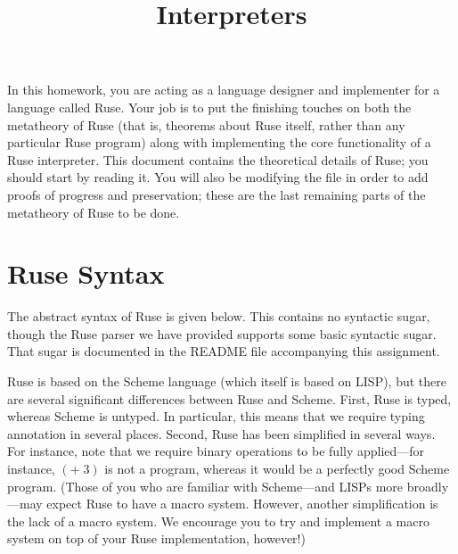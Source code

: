 \documentclass{homework}
\title{Interpreters}
\begin{document}
\maketitle

In this homework, you are acting as a language designer and implementer for a language called Ruse.
Your job is to put the finishing touches on both the metatheory of Ruse (that is, theorems about Ruse itself, rather than any particular Ruse program) along with implementing the core functionality of a Ruse interpreter.
This document contains the theoretical details of Ruse; you should start by reading it.
You will also be modifying the file in order to add proofs of progress and preservation; these are the last remaining parts of the metatheory of Ruse to be done.

\section{Ruse Syntax}
\label{sec:syntax}

The abstract syntax of Ruse is given below.
This contains no syntactic sugar, though the Ruse parser we have provided supports some basic syntactic sugar.
That sugar is documented in the README file accompanying this assignment.

Ruse is based on the Scheme language (which itself is based on LISP), but there are several significant differences between Ruse and Scheme.
First, Ruse is typed, whereas Scheme is untyped.
In particular, this means that we require typing annotation in several places.
Second, Ruse has been simplified in several ways.
For instance, note that we require binary operations to be fully applied---for instance, $(+\;3)$ is not a program, whereas it would be a perfectly good Scheme program.
(Those of you who are familiar with Scheme---and LISPs more broadly---may expect Ruse to have a macro system.
However, another simplification is the lack of a macro system.
We encourage you to try and implement a macro system on top of your Ruse implementation, however!)
\end{document}
